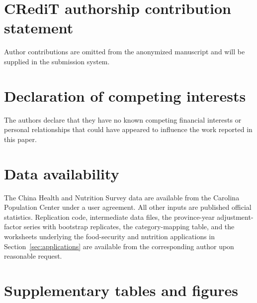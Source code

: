 \documentclass[preprint,12pt,authoryear]{elsarticle}
\begin{document}
\section*{CRediT authorship contribution statement}
Author contributions are omitted from the anonymized manuscript and will be supplied in the submission system.

\section*{Declaration of competing interests}
The authors declare that they have no known competing financial interests or personal relationships that could have appeared to influence the work reported in this paper.

\section*{Data availability}
The China Health and Nutrition Survey data are available from the Carolina Population Center under a user agreement. All other inputs are published official statistics. Replication code, intermediate data files, the province-year adjustment-factor series with bootstrap replicates, the category-mapping table, and the worksheets underlying the food-security and nutrition applications in Section~\ref{sec:applications} are available from the corresponding author upon reasonable request.




\newpage
\appendix
\setcounter{table}{0}
\setcounter{figure}{0}
\renewcommand{\thetable}{A.\arabic{table}}
\renewcommand{\thefigure}{A.\arabic{figure}}
\renewcommand{\theHtable}{A.\arabic{table}}
\renewcommand{\theHfigure}{A.\arabic{figure}}

\section{Supplementary tables and figures}
\label{app:supplementary}
\end{document}
